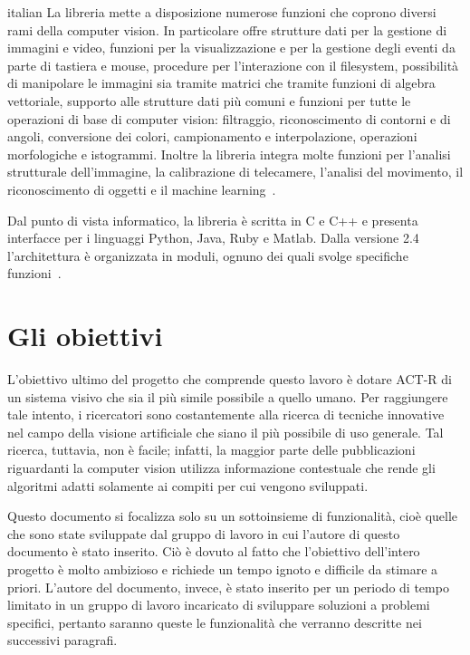\begin{otherlanguage*}{italian}
				La libreria mette a disposizione numerose funzioni che coprono diversi rami della computer vision.
				In particolare offre strutture dati per la gestione di immagini e video, funzioni per la visualizzazione e per la gestione degli eventi da parte di tastiera e mouse, procedure per l'interazione con il filesystem, possibilità di manipolare le immagini sia tramite matrici che tramite funzioni di algebra vettoriale, supporto alle strutture dati più comuni e funzioni per tutte le operazioni di base di computer vision: filtraggio, riconoscimento di contorni e di angoli, conversione dei colori, campionamento e interpolazione, operazioni morfologiche e istogrammi.
				Inoltre la libreria integra molte funzioni per l'analisi strutturale dell'immagine, la calibrazione di telecamere, l'analisi del movimento, il riconoscimento di oggetti e il machine learning~\cite{Agam2006}.
				
				Dal punto di vista informatico, la libreria è scritta in C e C++ e presenta interfacce per i linguaggi Python, Java, Ruby e Matlab.
				Dalla versione 2.4 l'architettura è organizzata in moduli, ognuno dei quali svolge specifiche funzioni~\cite{OpenCVDoc}. 
				


	\section*{Gli obiettivi}\label{obiettivi}
		L'obiettivo ultimo del progetto che comprende questo lavoro è dotare \mbox{ACT-R} di un sistema visivo che sia il più simile possibile a quello umano.
		Per raggiungere tale intento, i ricercatori sono costantemente alla ricerca di tecniche innovative nel campo della visione artificiale che siano il più possibile di uso generale.
		Tal ricerca, tuttavia, non è facile; infatti, la maggior parte delle pubblicazioni riguardanti la computer vision utilizza informazione contestuale che rende gli algoritmi adatti solamente ai compiti per cui vengono sviluppati.
		
		Questo documento si focalizza solo su un sottoinsieme di funzionalità, cioè quelle che sono state sviluppate dal gruppo di lavoro in cui l'autore di questo documento è stato inserito.	
		Ciò è dovuto al fatto che l'obiettivo dell'intero progetto è molto ambizioso e richiede un tempo ignoto e difficile da stimare a priori. 
		L'autore del documento, invece, è stato inserito per un periodo di tempo limitato in un gruppo di lavoro incaricato di sviluppare soluzioni a problemi specifici, pertanto saranno queste le funzionalità che verranno descritte nei successivi paragrafi.


\end{otherlanguage*}
